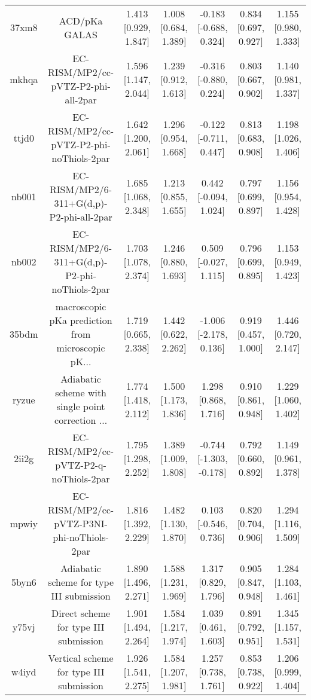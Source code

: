 \documentclass{article}
\begin{document}
\begin{center}
\begin{longtable}{|ccccccc|}
 37xm8 &                                      ACD/pKa GALAS &  1.413 [0.929, 1.847] &  1.008 [0.684, 1.389] &   -0.183 [-0.688, 0.324] &  0.834 [0.697, 0.927] &   1.155 [0.980, 1.333] \\
 mkhqa &                EC-RISM/MP2/cc-pVTZ-P2-phi-all-2par &  1.596 [1.147, 2.044] &  1.239 [0.912, 1.613] &   -0.316 [-0.880, 0.224] &  0.803 [0.667, 0.902] &   1.140 [0.981, 1.337] \\
 ttjd0 &           EC-RISM/MP2/cc-pVTZ-P2-phi-noThiols-2par &  1.642 [1.200, 2.061] &  1.296 [0.954, 1.668] &   -0.122 [-0.711, 0.447] &  0.813 [0.683, 0.908] &   1.198 [1.026, 1.406] \\
 nb001 &           EC-RISM/MP2/6-311+G(d,p)-P2-phi-all-2par &  1.685 [1.068, 2.348] &  1.213 [0.855, 1.655] &    0.442 [-0.094, 1.024] &  0.797 [0.699, 0.897] &   1.156 [0.954, 1.428] \\
 nb002 &      EC-RISM/MP2/6-311+G(d,p)-P2-phi-noThiols-2par &  1.703 [1.078, 2.374] &  1.246 [0.880, 1.693] &    0.509 [-0.027, 1.115] &  0.796 [0.699, 0.895] &   1.153 [0.949, 1.423] \\
 35bdm &  macroscopic pKa prediction from microscopic pK... &  1.719 [0.665, 2.338] &  1.442 [0.622, 2.262] &   -1.006 [-2.178, 0.136] &  0.919 [0.457, 1.000] &   1.446 [0.720, 2.147] \\
 ryzue &  Adiabatic scheme with single point correction ... &  1.774 [1.418, 2.112] &  1.500 [1.173, 1.836] &     1.298 [0.868, 1.716] &  0.910 [0.861, 0.948] &   1.229 [1.060, 1.402] \\
 2ii2g &             EC-RISM/MP2/cc-pVTZ-P2-q-noThiols-2par &  1.795 [1.298, 2.252] &  1.389 [1.009, 1.808] &  -0.744 [-1.303, -0.178] &  0.792 [0.660, 0.892] &   1.149 [0.961, 1.378] \\
 mpwiy &         EC-RISM/MP2/cc-pVTZ-P3NI-phi-noThiols-2par &  1.816 [1.392, 2.229] &  1.482 [1.130, 1.870] &    0.103 [-0.546, 0.736] &  0.820 [0.704, 0.906] &   1.294 [1.116, 1.509] \\
 5byn6 &           Adiabatic scheme for type III submission &  1.890 [1.496, 2.271] &  1.588 [1.231, 1.969] &     1.317 [0.829, 1.796] &  0.905 [0.847, 0.948] &   1.284 [1.103, 1.461] \\
 y75vj &              Direct scheme for type III submission &  1.901 [1.494, 2.264] &  1.584 [1.217, 1.974] &     1.039 [0.461, 1.603] &  0.891 [0.792, 0.951] &   1.345 [1.157, 1.531] \\
 w4iyd &            Vertical scheme for type III submission &  1.926 [1.541, 2.275] &  1.584 [1.207, 1.981] &     1.257 [0.738, 1.761] &  0.853 [0.738, 0.922] &   1.206 [0.999, 1.404] \\

\end{longtable}
\end{center}
\end{document}
